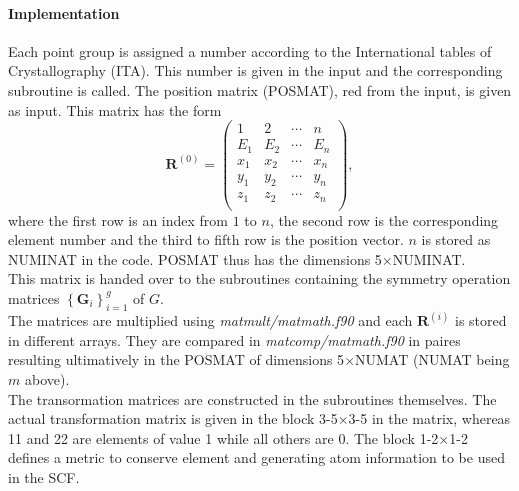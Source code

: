 \documentclass[a4paper,10pt]{scrartcl}
\begin{document}
\paragraph{Implementation}
Each point group is assigned a number according to the International tables of Crystallography (ITA). This number is given in the input and the corresponding subroutine
is called. The position matrix (POSMAT), red from the input, is given as input. This matrix has the form
\begin{equation}
 \bm{R}^{(0)} = \begin{pmatrix} 1 & 2 & \cdots & n \\ 
                                E_{1} & E_{2} & \cdots & E_{n} \\ 
                                x_{1} & x_{2} & \cdots & x_{n} \\ 
                                y_{1} & y_{2} & \cdots & y_{n} \\
                                z_{1} & z_{2} & \cdots & z_{n} \\\end{pmatrix},
\end{equation}
where the first row is an index from $1$ to $n$, the second row is the corresponding element number and the third to fifth row is the position vector. $n$
is stored as NUMINAT in the code. POSMAT thus has the dimensions 5$\times$NUMINAT.\\
This matrix is handed over to the subroutines containing the symmetry operation matrices $\left\{\bm{G}_{i}\right\}_{i=1}^{g}$ of $G$.\\
The matrices are multiplied using \emph{matmult/matmath.f90} and each $\bm{R}^{(i)}$ is stored in different arrays. They are compared in \emph{matcomp/matmath.f90}
in paires resulting ultimatively in the POSMAT of dimensions 5$\times$NUMAT (NUMAT being $m$ above).\\
The transormation matrices are constructed in the subroutines themselves. The actual transformation matrix is given in the block 3-5$\times$3-5 in the 
matrix, whereas 11 and 22 are elements of value 1 while all others are 0. The block 1-2$\times$1-2 defines a metric to conserve element and generating atom information
to be used in the SCF.
\end{document}
